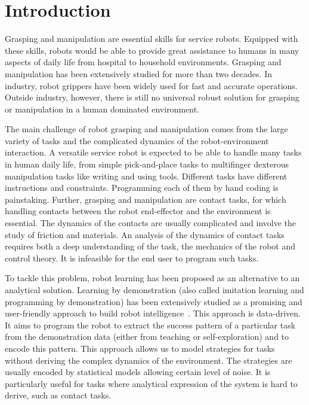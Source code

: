 \chapter{Introduction}
\label{cha1}

\setcounter{page}{1}
Grasping and manipulation are essential skills for service robots. Equipped with these skills, robots would be able to provide great assistance to humans in many aspects of daily life from hospital to household environments. Grasping and manipulation has been extensively studied for more than two decades. In industry, robot grippers have been widely used for fast and accurate operations. Outside industry, however, there is still no universal robust solution for grasping or manipulation in a human dominated environment.

The main challenge of robot grasping and manipulation comes from the large variety of tasks and the complicated dynamics of the robot-environment interaction. A versatile service robot is expected to be able to handle many tasks in human daily life, from simple pick-and-place tasks to multifinger dexterous manipulation tasks like writing and using tools. Different tasks have different instructions and constraints. Programming each of them by hand coding is painstaking. Further, grasping and manipulation are contact tasks, for which handling contacts between the robot end-effector and the environment is essential. The dynamics of the contacts are usually complicated and involve the study of friction and materials. An analysis of the dynamics of contact tasks requires both a deep understanding of the task, the mechanics of the robot and control theory. It is infeasible for the end user to program such tasks.

To tackle this problem, robot learning has been proposed as an alternative to an analytical solution. Learning by demonstration (also called imitation learning and programming by demonstration) has been extensively studied as a promising and user-friendly approach to build robot intelligence~\citep{schaal2003computational,dillmann2004teaching,billard2006discriminative,calinon2007incremental}. This approach is data-driven. It aims to program the robot to extract the success pattern of a particular task from the demonstration data (either from teaching or self-exploration) and to encode this pattern. This approach allows us to model strategies for tasks without deriving the complex dynamics of the environment. The strategies are usually encoded by statistical models allowing certain level of noise. It is particularly useful for tasks where analytical expression of the system is hard to derive, such as contact tasks.


